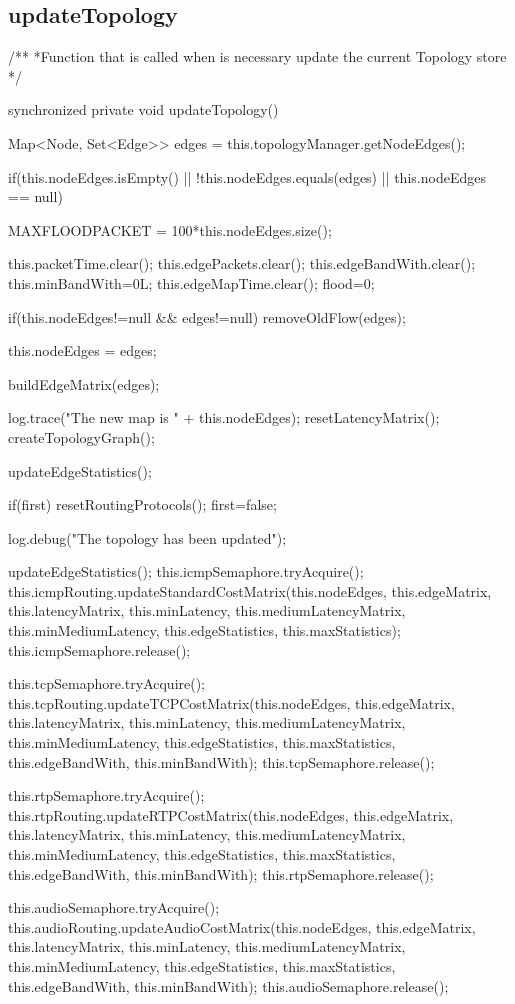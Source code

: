 \documentclass[a4paper,11pt]{book}
\begin{document}
\subsection{updateTopology}\label{updateTopologyCode}
\begin{java}
/**
    *Function that is called when is necessary update the current Topology store
    */

    synchronized private void updateTopology(){

      Map<Node, Set<Edge>> edges = this.topologyManager.getNodeEdges();


      if(this.nodeEdges.isEmpty() || !this.nodeEdges.equals(edges) || this.nodeEdges == null){

        MAXFLOODPACKET = 100*this.nodeEdges.size();

        this.packetTime.clear();
        this.edgePackets.clear();
        this.edgeBandWith.clear();
        this.minBandWith=0L;
        this.edgeMapTime.clear();
        flood=0;

        if(this.nodeEdges!=null && edges!=null){
          removeOldFlow(edges);
        }

        this.nodeEdges = edges;

        buildEdgeMatrix(edges);

        log.trace("The new map is " + this.nodeEdges);
        resetLatencyMatrix();
        createTopologyGraph();

        updateEdgeStatistics();

        if(first){
          resetRoutingProtocols();
          first=false;
        }

        log.debug("The topology has been updated");

      }

        updateEdgeStatistics();
        this.icmpSemaphore.tryAcquire();
        this.icmpRouting.updateStandardCostMatrix(this.nodeEdges, this.edgeMatrix, this.latencyMatrix, this.minLatency,
        this.mediumLatencyMatrix, this.minMediumLatency, this.edgeStatistics, this.maxStatistics);
        this.icmpSemaphore.release();

        this.tcpSemaphore.tryAcquire();
        this.tcpRouting.updateTCPCostMatrix(this.nodeEdges, this.edgeMatrix, this.latencyMatrix, this.minLatency,
        this.mediumLatencyMatrix, this.minMediumLatency, this.edgeStatistics, this.maxStatistics, this.edgeBandWith, this.minBandWith);
        this.tcpSemaphore.release();


        this.rtpSemaphore.tryAcquire();
        this.rtpRouting.updateRTPCostMatrix(this.nodeEdges, this.edgeMatrix, this.latencyMatrix, this.minLatency,
        this.mediumLatencyMatrix, this.minMediumLatency, this.edgeStatistics, this.maxStatistics, this.edgeBandWith, this.minBandWith);
        this.rtpSemaphore.release();

        this.audioSemaphore.tryAcquire();
        this.audioRouting.updateAudioCostMatrix(this.nodeEdges, this.edgeMatrix, this.latencyMatrix, this.minLatency,
        this.mediumLatencyMatrix, this.minMediumLatency, this.edgeStatistics, this.maxStatistics, this.edgeBandWith, this.minBandWith);
        this.audioSemaphore.release();
    }
\end{java}
\end{document}
